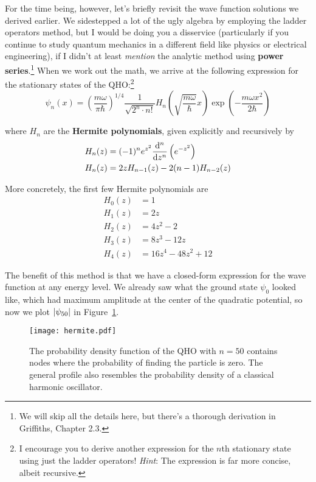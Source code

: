 For the time being, however, let's briefly revisit the wave function solutions we derived earlier. We sidestepped a lot of the ugly algebra by employing the ladder operators method, but I would be doing you a disservice (particularly if you continue to study quantum mechanics in a different field like physics or electrical engineering), if I didn't at least \emph{mention} the analytic method using \textbf{power series}.\footnote{We will skip all the details here, but there's a thorough derivation in Griffiths, Chapter 2.3.} When we work out the math, we arrive at the following expression for the stationary states of the QHO:\footnote{I encourage you to derive another expression for the $n$th stationary state using just the ladder operators! \emph{Hint}: The expression is far more concise, albeit recursive.} 
\begin{equation}
	\psi_n(x) = \left(\frac{m\omega}{\pi\hbar}\right)^{1/4} \frac{1}{\sqrt{2^n \cdot n!}} H_n \left(\sqrt{\frac{m\omega}{\hbar}}x\right) \exp \left(-\frac{m\omega x^2}{2\hbar}\right) \label{eq:pow-qho}
\end{equation}

where $H_n$ are the \textbf{Hermite polynomials}, given explicitly and recursively by
\begin{align*}
	H_n(z) &= (-1)^n e^{z^2} \dv[n]{z} \left( e^{-z^2} \right) \\
	H_n(z) &= 2zH_{n-1}(z) - 2(n-1)H_{n-2}(z)
\end{align*}

More concretely, the first few Hermite polynomials are
\begin{align*}
	H_0(z) &= 1 \\
	H_1(z) &= 2z \\
	H_2(z) &= 4z^2-2 \\
	H_3(z) &= 8z^3 - 12z \\
	H_4(z) &= 16z^4 - 48z^2 + 12
\end{align*}

The benefit of this method is that we have a closed-form expression for the wave function at any energy level. We already saw what the ground state $\psi_0$ looked like, which had maximum amplitude at the center of the quadratic potential, so now we plot $\abs{\psi_{50}}$ in Figure~\ref{fig:qho-50}.

\begin{figure}[!h]
	\centering
	\texttt{[image: hermite.pdf]}
	\caption{The probability density function of the QHO with $n=50$ contains nodes where the probability of finding the particle is zero. The general profile also resembles the probability density of a classical harmonic oscillator.}
	\label{fig:qho-50}
\end{figure}


